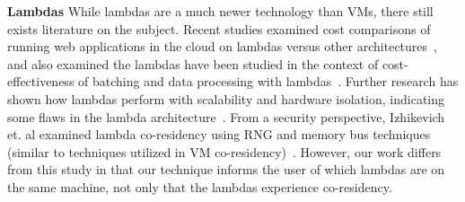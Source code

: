 \noindent \textbf{Lambdas} 
While lambdas are a much newer technology than VMs, there still exists literature
on the subject. Recent studies examined cost comparisons of running web
applications in the cloud on lambdas versus other
architectures~\cite{villamizar2016}, and also examined the lambdas have been
studied in the context of cost-effectiveness of batching and data processing with
lambdas~\cite{kiran2015}.  Further research has shown how lambdas perform with
scalability and hardware isolation, indicating some flaws in the lambda
architecture~\cite{wangusenix2018}. From a security perspective, Izhikevich et.
al examined lambda co-residency using RNG and memory bus techniques (similar to
techniques utilized in VM co-residency)~\cite{izhikevich2018}. However, our work
differs from this study in that our technique informs the user of which lambdas
are on the same machine, not only that the lambdas experience co-residency.
